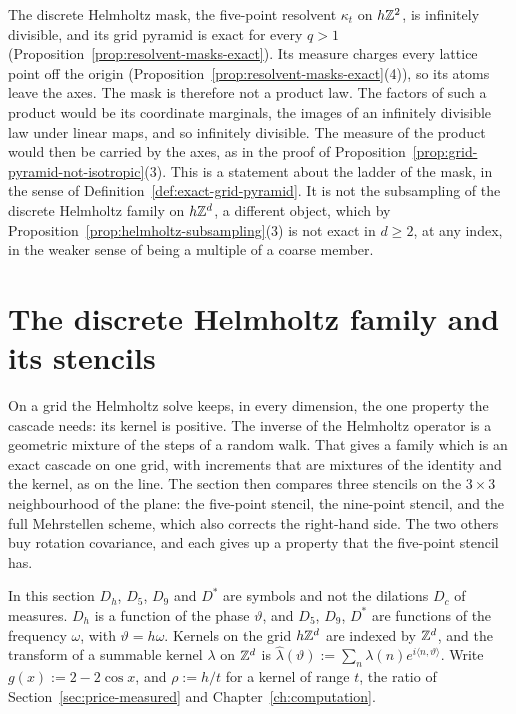 The discrete Helmholtz mask, the five-point resolvent $\kappa_t$ on $h\mathbb{Z}^2$, is infinitely
divisible, and its grid pyramid is exact for every $q > 1$
(Proposition~\ref{prop:resolvent-masks-exact}). Its \Levy{} measure charges every lattice point off
the origin (Proposition~\ref{prop:resolvent-masks-exact}(4)), so its atoms leave the axes. The
mask is therefore not a product law. The factors of such a product would be its coordinate
marginals, the images of an infinitely divisible law under linear maps, and so infinitely
divisible. The \Levy{} measure of the product would then be carried by the axes, as in the proof of
Proposition~\ref{prop:grid-pyramid-not-isotropic}(3). This is a statement about the
ladder of the mask, in the sense of Definition~\ref{def:exact-grid-pyramid}. It is not the
subsampling of the discrete Helmholtz family on $h\mathbb{Z}^d$, a different object, which by
Proposition~\ref{prop:helmholtz-subsampling}(3) is not exact in $d \ge 2$, at any index, in the
weaker sense of being a multiple of a coarse member.

\section{The discrete Helmholtz family and its stencils}
\label{sec:discrete-helmholtz}

On a grid the Helmholtz solve keeps, in every dimension, the one property the cascade needs: its
kernel is positive. The inverse of the Helmholtz operator is a geometric mixture of the steps of a
random walk. That gives a family which is an exact cascade on one grid, with increments that are
mixtures of the identity and the kernel, as on the line. The section then compares three stencils
on the $3 \times 3$ neighbourhood of the plane: the five-point stencil, the nine-point stencil, and
the full Mehrstellen scheme, which also corrects the right-hand side. The two others buy rotation
covariance, and each gives up a property that the five-point stencil has.

In this section $D_h$, $D_5$, $D_9$ and $D^*$ are symbols and not the dilations $D_c$ of measures.
$D_h$ is a function of the phase $\vartheta$, and $D_5$, $D_9$, $D^*$ are functions of the frequency
$\omega$, with $\vartheta = h\omega$. Kernels on the grid $h\mathbb{Z}^d$ are indexed by $\mathbb{Z}^d$, and the
transform of a summable kernel $\lambda$ on $\mathbb{Z}^d$ is $\widehat\lambda(\vartheta) := \sum_n \lambda(n)
e^{i\langle n, \vartheta\rangle}$. Write $g(x) := 2 - 2\cos x$, and $\rho := h/t$ for a kernel of range
$t$, the ratio of Section~\ref{sec:price-measured} and Chapter~\ref{ch:computation}.


